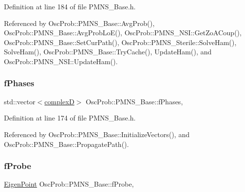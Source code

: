 Definition at line 184 of file P\+M\+N\+S\+\_\+\+Base.\+h.



Referenced by Osc\+Prob\+::\+P\+M\+N\+S\+\_\+\+Base\+::\+Avg\+Prob(), Osc\+Prob\+::\+P\+M\+N\+S\+\_\+\+Base\+::\+Avg\+Prob\+Lo\+E(), Osc\+Prob\+::\+P\+M\+N\+S\+\_\+\+N\+S\+I\+::\+Get\+Zo\+A\+Coup(), Osc\+Prob\+::\+P\+M\+N\+S\+\_\+\+Base\+::\+Set\+Cur\+Path(), Osc\+Prob\+::\+P\+M\+N\+S\+\_\+\+Sterile\+::\+Solve\+Ham(), Solve\+Ham(), Osc\+Prob\+::\+P\+M\+N\+S\+\_\+\+Base\+::\+Try\+Cache(), Update\+Ham(), and Osc\+Prob\+::\+P\+M\+N\+S\+\_\+\+N\+S\+I\+::\+Update\+Ham().

\mbox{\label{classOscProb_1_1PMNS__Base_ab8d26b722047d49d977f5f2d83026ede}} 
\subsubsection{\texorpdfstring{f\+Phases}{fPhases}}
{\footnotesize\ttfamily std\+::vector$<$\hyperlink{EigenPoint_8h_a67ca8e107e20610c3fff78d5e726ece0}{complexD}$>$ Osc\+Prob\+::\+P\+M\+N\+S\+\_\+\+Base\+::f\+Phases\hspace{0.3cm}{\ttfamily [protected]}, {\ttfamily [inherited]}}



Definition at line 174 of file P\+M\+N\+S\+\_\+\+Base.\+h.



Referenced by Osc\+Prob\+::\+P\+M\+N\+S\+\_\+\+Base\+::\+Initialize\+Vectors(), and Osc\+Prob\+::\+P\+M\+N\+S\+\_\+\+Base\+::\+Propagate\+Path().

\mbox{\label{classOscProb_1_1PMNS__Base_ab1fe4800ee3ae48df4fc942dce00e0d3}} 
\subsubsection{\texorpdfstring{f\+Probe}{fProbe}}
{\footnotesize\ttfamily \hyperlink{structOscProb_1_1EigenPoint}{Eigen\+Point} Osc\+Prob\+::\+P\+M\+N\+S\+\_\+\+Base\+::f\+Probe\hspace{0.3cm}{\ttfamily [protected]}, {\ttfamily [inherited]}}



